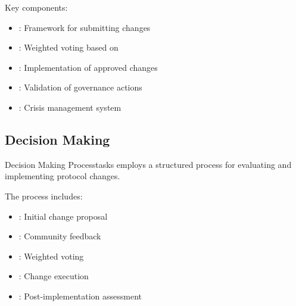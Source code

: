 Key components:

\begin{itemize}[leftmargin=*]
\item {}: Framework for submitting changes
\item {}: Weighted voting based on 
\item {}: Implementation of approved changes
\item {}: Validation of governance actions
\item {}: Crisis management system
\end{itemize}

\subsection{Decision Making}

\begin{mfai-box-prove}{Decision Making Process}{tasks}
 employs a structured process for evaluating and implementing protocol changes.
\end{mfai-box-prove}

The process includes:

\begin{itemize}[leftmargin=*]
\item {}: Initial change proposal
\item {}: Community feedback
\item {}: Weighted voting
\item {}: Change execution
\item {}: Post-implementation assessment
\end{itemize}

\begin{center}
\end{center}

